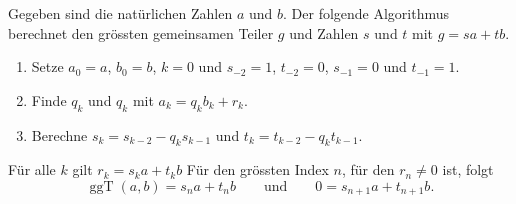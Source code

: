 \begin{satz}
Gegeben sind die natürlichen Zahlen $a$ und $b$.
Der folgende Algorithmus berechnet den grössten gemeinsamen Teiler $g$
und Zahlen $s$ und $t$ mit $g=sa+tb$.
\begin{enumerate}
\item
Setze $a_0=a$, $b_0=b$, $k=0$ und $s_{-2}=1$, $t_{-2}=0$, $s_{-1}=0$
und $t_{-1}=1$.
\item
Finde $q_k$ und $q_k$ mit $a_k= q_kb_k+r_k$.
\item
Berechne
$s_k=s_{k-2}-q_ks_{k-1}$ 
und
$t_k=t_{k-2}-q_kt_{k-1}$.
\end{enumerate}
Für alle $k$ gilt
$r_k = s_ka+t_kb$
Für den grössten Index $n$, für den $r_n\ne 0$ ist, folgt
\[
\operatorname{ggT}(a,b)
=
s_na+t_nb
\qquad\text{und}\qquad
0
=
s_{n+1}a+t_{n+1}b.
\]
\end{satz}

